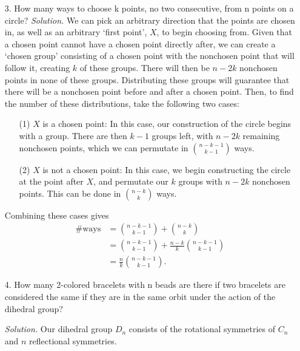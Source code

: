 \documentclass[11pt,letterpaper]{article}
\newenvironment{solution}{\color{black}\textit{Solution.}}{\color{gray}}
\begin{document}
\begin{enumerate}
    \item[3.] How many ways to choose k points, no two consecutive, from n points on a circle?
    \begin{solution}
        We can pick an arbitrary direction that the points are chosen in, as well as an arbitrary `first point', $X$, to begin choosing from. Given that a chosen point cannot have a chosen point directly after, we can create a `chosen group' consisting of a chosen point with the nonchosen point that will follow it, creating $k$ of these groups. There will then be $n-2k$ nonchosen points in none of these groups. Distributing these groups will guarantee that there will be a nonchosen point before and after a chosen point. Then, to find the number of these distributions, take the following two cases:

        \begin{enumerate}
            \item[(1)] $X$ is a chosen point: In this case, our construction of the circle begins with a group. There are then $k-1$ groups left, with $n-2k$ remaining nonchosen points, which we can permutate in $\binom{n-k-1}{k-1}$ ways.
            \item[(2)] $X$ is not a chosen point: In this case, we begin constructing the circle at the point after $X$, and permutate our $k$ groups with $n-2k$ nonchosen points. This can be done in $\binom{n-k}{k}$ ways.
        \end{enumerate}
        Combining these cases gives
        \begin{align*}
            \text{\# ways} &= \binom{n-k-1}{k-1}
            + \binom{n-k}{k} \\
            &= \binom{n-k-1}{k-1} + \frac{n-k}{k}\binom{n-k-1}{k-1} \\
            &= \frac{n}{k}\binom{n-k-1}{k-1}.
        \end{align*}
    \end{solution}
    
    \item[4.] How many 2-colored bracelets with n beads are there if two bracelets are considered the same if they are in the same orbit under the action of the dihedral group?
    
    \begin{solution}
        Our dihedral group $D_n$ consists of the rotational symmetries of $C_n$ and $n$ reflectional symmetries. 
        

\end{solution}
\end{enumerate}
\end{document}
